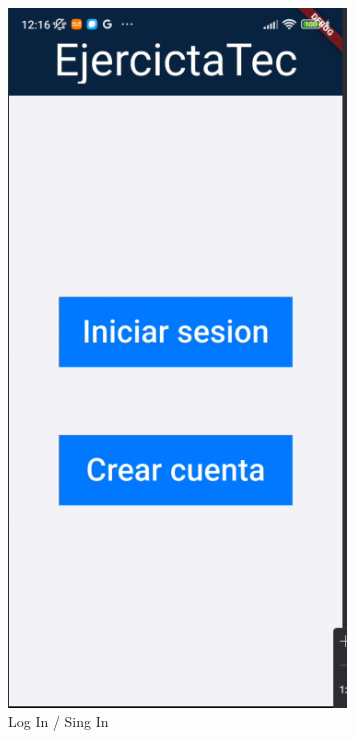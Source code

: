 \begin{figure}[H]
   \centering
    \includegraphics[width=0.8\textwidth]{pantallas/LogSingIn.png}
    \caption{Log In / Sing In}
    \label{fig:LogSingIn}
\end{figure}

